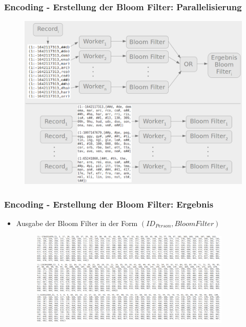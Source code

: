 \documentclass{beamer}
\begin{document}
    \begin{frame}
    		\frametitle{Encoding - Erstellung der Bloom Filter: Parallelisierung}
    		\begin{figure}[H]
    				\includegraphics[width=\textwidth]{graphics/bf_par2.png}
    		\end{figure}
    \end{frame}
    
    \begin{frame}
    		\frametitle{Encoding - Erstellung der Bloom Filter: Ergebnis}
    		\begin{itemize}
    			\item Ausgabe der Bloom Filter in der Form $(ID_{Person}, BloomFilter)$
    				\begin{figure}[H]
    					\includegraphics[width=0.9\textwidth]{graphics/bloomfilter.png}
    				\end{figure}
    		\end{itemize}
    \end{frame}
\end{document}

